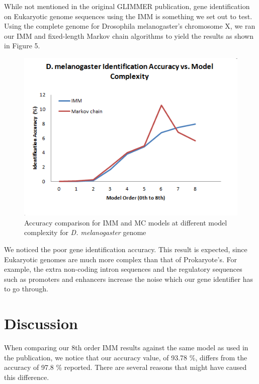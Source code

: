 \documentclass[11pt,letterpaper]{article}
\begin{document}
While not mentioned in the original GLIMMER publication, gene identification on Eukaryotic genome sequences using the IMM is something we set out to test. Using the complete genome for Drosophila melanogaster’s chromosome X, we ran our IMM and fixed-length Markov chain algorithms to yield the results as shown in Figure 5.

\begin{figure}
	\begin{center}
		\includegraphics[scale=0.8]{plots/accuracy_vs_model_complexity_drosophila.png}
	\end{center}
	\caption{\label{font-table} Accuracy comparison for IMM and MC models at different model complexity for \emph{D. melanogaster} genome}
\end{figure}

We noticed the poor gene identification accuracy. This result is expected, since Eukaryotic genomes are much more complex than that of Prokaryote’s. For example, the extra non-coding intron sequences and the regulatory sequences such as promoters and enhancers increase the noise which our gene identifier has to go through. 

\section{Discussion}

When comparing our 8th order IMM results against the same model as used in the publication, we notice that our accuracy value, of 93.78 \%, differs from the accuracy of 97.8 \% reported. There are several reasons that might have caused this difference.
\end{document}

